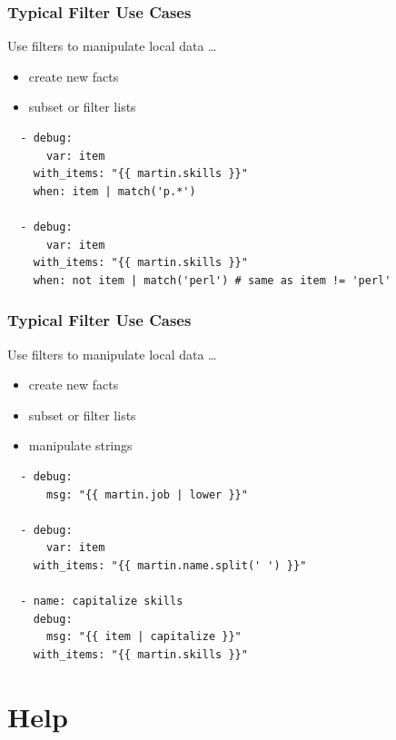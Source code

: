 \documentclass[pdf]{beamer}
\begin{document}
\begin{frame}[fragile]
  \frametitle{Typical Filter Use Cases}
  Use filters to manipulate local data \ldots
  \begin{itemize}
    \item {create new facts}
    \item \alert<1>{subset or filter lists}
  \end{itemize}
  \begin{lstlisting}
  - debug:
      var: item
    with_items: "{{ martin.skills }}"
    when: item | match('p.*')

  - debug:
      var: item
    with_items: "{{ martin.skills }}"
    when: not item | match('perl') # same as item != 'perl'
  \end{lstlisting}
\end{frame}

\begin{frame}[fragile]
  \frametitle{Typical Filter Use Cases}
  Use filters to manipulate local data \ldots
  \begin{itemize}
    \item {create new facts}
    \item {subset or filter lists}
    \item \alert<1>{manipulate strings}
  \end{itemize}
  \begin{lstlisting}
  - debug:
      msg: "{{ martin.job | lower }}"

  - debug:
      var: item
    with_items: "{{ martin.name.split(' ') }}"

  - name: capitalize skills
    debug:
      msg: "{{ item | capitalize }}"
    with_items: "{{ martin.skills }}"
  \end{lstlisting}
\end{frame}

\section{Help}

\end{document}
